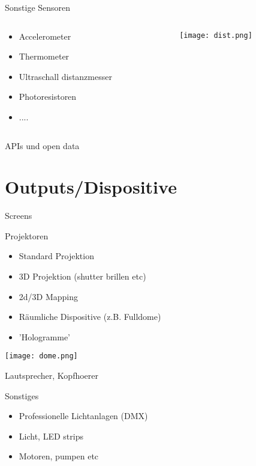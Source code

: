 \begin{frame}{Sonstige Sensoren}

\begin{columns}
	\begin{column}{0.5\textwidth}
		\begin{itemize}
		\item Accelerometer
		\item Thermometer
		\item Ultraschall distanzmesser
		\item Photoresistoren
		\item ....
		\end{itemize}
	\end{column}

	\begin{column}{0.5\textwidth}
		\texttt{[image: dist.png]}
	\end{column}

\end{columns}

\end{frame}

\begin{frame}{APIs und open data}
\end{frame}

\section{Outputs/Dispositive}
 \frame{\sectionpage}

\begin{frame}{Screens}

\end{frame}


\begin{frame}{Projektoren}
\begin{itemize}
	\item Standard Projektion
	\item 3D Projektion (shutter brillen etc)
	\item 2d/3D Mapping
	\item Räumliche Dispositive (z.B. Fulldome)
	\item 'Hologramme'
\end{itemize}
\begin{center}

\texttt{[image: dome.png]}
\end{center}
\end{frame}


\begin{frame}{Lautsprecher, Kopfhoerer}

\end{frame}

\begin{frame}{Sonstiges}
\begin{itemize}
	\item Professionelle Lichtanlagen (DMX)
	\item Licht, LED strips
	\item Motoren, pumpen etc

\end{itemize}

\end{frame}



